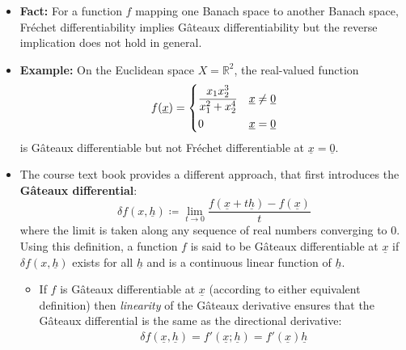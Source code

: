 \documentclass[11pt,twoside]{report}
\newcommand{\bbR}{{\mathbb{R}}}
\newcommand{\vecnot}{\underline}
\begin{document}
\begin{itemize}
\item \textbf{Fact:} For a function $f$ mapping one Banach space to another Banach space,   Fr\'{e}chet differentiability implies  G\^{a}teaux differentiability but the reverse implication does not hold in general. 


\item \textbf{Example:} On the Euclidean space $X=  \bbR^2$, the real-valued function 
\begin{align*}
f(\vecnot{x}) = \begin{dcases} 
\frac{x_1 x_2^3}{ x_1^2 + x_2^4}  & \vecnot{x} \ne \vecnot{0} \\
0 & \vecnot{x} = \vecnot{0}
\end{dcases}
\end{align*}
is  G\^{a}teaux differentiable but not Fr\'{e}chet differentiable at $\vecnot{x} = \vecnot{0}$.
%

\item %
The course text book provides a different approach, that first introduces the    \textbf{G\^{a}teaux differential}:
\[
\delta f( x, \vecnot{h})  \coloneqq \lim_{t \to 0} \frac{f(\vecnot{x}+t \vecnot{h}) - f(\vecnot{x})}{t}
\]
where the limit is taken along any sequence of real numbers converging to 0. Using this definition, a function $f$ is  said to be G\^{a}teaux differentiable  at $\vecnot{x}$ if  $\delta f( x, \vecnot{h})$ exists for all $ \vecnot{h}$ and is a continuous linear function of $ \vecnot{h}$. 

\begin{itemize}
\item 
If $f$ is G\^{a}teaux differentiable at $\vecnot{x}$  (according to either equivalent definition) then \emph{linearity} of the G\^{a}teaux  derivative ensures that the G\^{a}teaux differential is the same as the directional derivative: %
\begin{align*}
\delta f( \vecnot{x}, \vecnot{h}) = f'( \vecnot{x};  \vecnot{h}) = f'(\vecnot{x}) \vecnot{h}
\end{align*}


\end{itemize}
\end{itemize}
\end{document}
